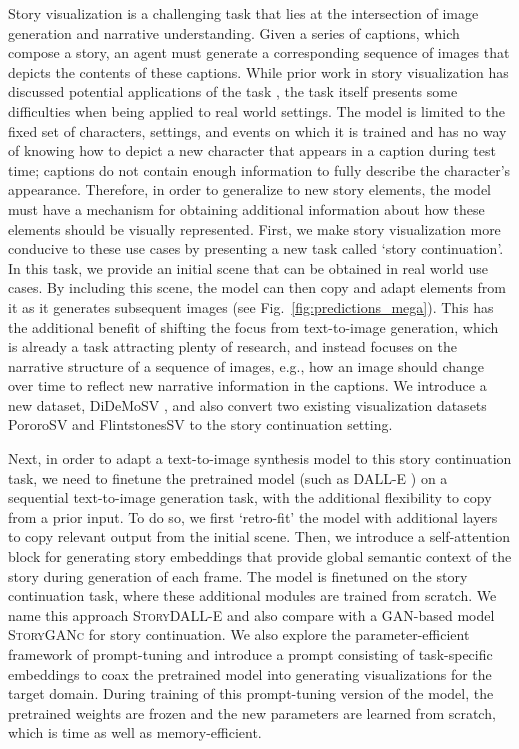 \documentclass[runningheads]{llncs}
\newcommand{\sdalle}[1]{\textsc{StoryDALL-E}}
\newcommand{\sgan}[1]{\textsc{StoryGANc}}
\begin{document}
Story visualization is a challenging task that lies at the intersection of image generation and narrative understanding. Given a series of captions, which compose a story, an agent must generate a corresponding sequence of images that depicts the contents of these captions. While prior work in story visualization has discussed potential applications of the task \cite{maharana2021improving, maharana2021integrating, li2019storygan, song2020CPCSV}, the task itself presents some difficulties when being applied to real world settings. The model is limited to the fixed set of characters, settings, and events on which it is trained and has no way of knowing how to depict a new character that appears in a caption during test time; captions do not contain enough information to fully describe the character's appearance. Therefore, in order to generalize to new story elements, the model must have a mechanism for obtaining additional information about how these elements should be visually represented. First, we make story visualization more conducive to these use cases by presenting a new task called `story continuation'. In this task, we provide an initial scene that can be obtained in real world use cases. By including this scene, the model can then copy and adapt elements from it as it generates subsequent images (see Fig.~\ref{fig:predictions_mega}). This has the additional benefit of shifting the focus from text-to-image generation, which is already a task attracting plenty of research, and instead focuses on the narrative structure of a sequence of images, e.g., how an image should change over time to reflect new narrative information in the captions. We introduce a new dataset, DiDeMoSV \cite{hendricks17iccv}, and also convert two existing visualization datasets PororoSV \cite{li2019storygan} and FlintstonesSV \cite{gupta2018imagine} to the story continuation setting. 

Next, in order to adapt a text-to-image synthesis model to this story continuation task, we need to finetune the pretrained model (such as DALL-E \cite{ramesh2021zero}) on a sequential text-to-image generation task, with the additional flexibility to copy from a prior input. To do so, we first `retro-fit' the model with additional layers to copy relevant output from the initial scene. Then, we introduce a self-attention block for generating story embeddings that provide global semantic context of the story during generation of each frame. The model is finetuned on the story continuation task, where these additional modules are trained from scratch. We name this approach \sdalle{} and also compare with a GAN-based model \sgan{} for story continuation. We also explore the parameter-efficient framework of prompt-tuning and introduce a prompt consisting of task-specific embeddings to coax the pretrained model into generating visualizations for the target domain. During training of this prompt-tuning version of the model, the pretrained weights are frozen and the new parameters are learned from scratch, which is time as well as memory-efficient.
\end{document}
